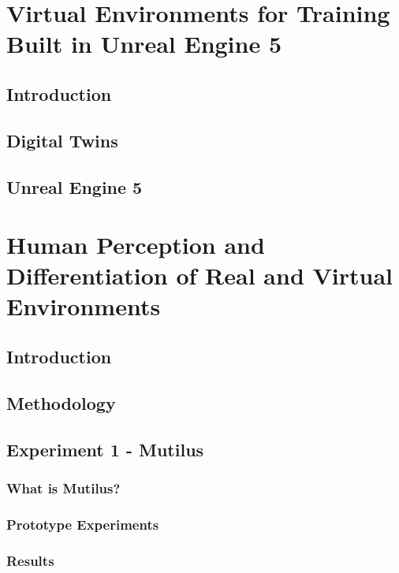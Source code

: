 \documentclass[12pt]{article}
\begin{document}
\section{Virtual Environments for Training Built in Unreal Engine 5}

\subsection{Introduction}

\subsection{Digital Twins}

\subsection{Unreal Engine 5}

\section{Human Perception and Differentiation of Real and Virtual Environments}

\subsection{Introduction}

\subsection{Methodology}

\subsection{Experiment 1 - Mutilus}

\subsubsection{What is Mutilus?}

\subsubsection{Prototype Experiments}

\subsubsection{Results}
\end{document}
